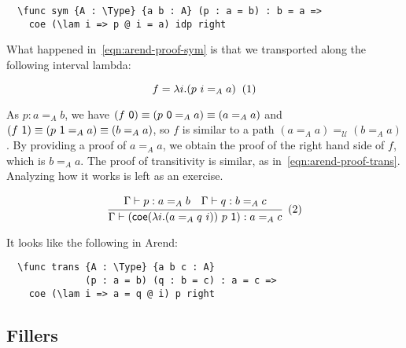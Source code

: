 \begin{verbatim}
  \func sym {A : \Type} {a b : A} (p : a = b) : b = a =>
    coe (\lam i => p @ i = a) idp right
\end{verbatim}

What happened in~\ref{eqn:arend-proof-sym} is that we transported
along the following interval lambda:

\[
  f = \lambda i. (p\ i =_A a)
  \xtag
\]

As $p : a =_A b$, we have
$(f \ \textsf 0) \equiv (p \ \textsf 0 =_A a) \equiv (a =_A a)$ and
$(f \ \textsf 1) \equiv (p \ \textsf 1 =_A a) \equiv (b =_A a)$,
so $f$ is similar to a path $(a =_A a) =_{\mathcal U} (b =_A a)$.
By providing a proof  of $a =_A a$,
we obtain the proof of the right hand side of $f$, which is $b =_A a$.
The proof of transitivity is similar, as in~\ref{eqn:arend-proof-trans}.
Analyzing how it works is left as an exercise.

\[
  \cfrac{
    \Gamma \vdash p : a =_A b
    \quad
    \Gamma \vdash q : b =_A c
  }{
    \Gamma \vdash (\textsf{coe}
    (\lambda i. (a =_A q\ i)) \ p \ \textsf 1)
    : a =_A c
  }
  \xtag \label{eqn:arend-proof-trans}
\]

It looks like the following in Arend:

\begin{verbatim}
  \func trans {A : \Type} {a b c : A}
              (p : a = b) (q : b = c) : a = c =>
    coe (\lam i => a = q @ i) p right
\end{verbatim}

\subsection{Fillers}
\label{subsec:fill}

\TODO
